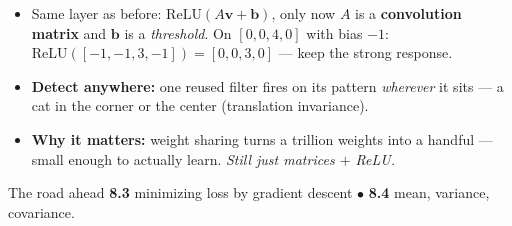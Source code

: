 \documentclass[aspectratio=169, 11pt]{beamer}
\newcommand{\vv}{\mathbf{v}}
\newcommand{\bb}{\mathbf{b}}
\newcommand{\relu}{\mathrm{ReLU}}
\begin{document}
\begin{frame}[t, plain]
  \begin{itemize}
    \setlength{\itemsep}{6pt}
    \item Same layer as before: $\relu(A\vv+\bb)$, only now $A$ is a \textbf{convolution matrix} and $\bb$ is a
          \emph{threshold}. On $[0,0,4,0]$ with bias $-1$: $\relu([-1,-1,3,-1])=[0,0,3,0]$ --- keep the strong response.
    \item \textbf{Detect anywhere:} one reused filter fires on its pattern \emph{wherever} it sits --- a cat in
          the corner or the center (translation invariance).
    \item \textbf{Why it matters:} weight sharing turns a trillion weights into a handful --- small enough to
          actually learn. \emph{Still just matrices $+$ ReLU.}
  \end{itemize}
  \vspace{2pt}
  \begin{block}{The road ahead}
    \textbf{8.3} minimizing loss by gradient descent \;$\bullet$\; \textbf{8.4} mean, variance, covariance.
  \end{block}
\end{frame}
\end{document}

